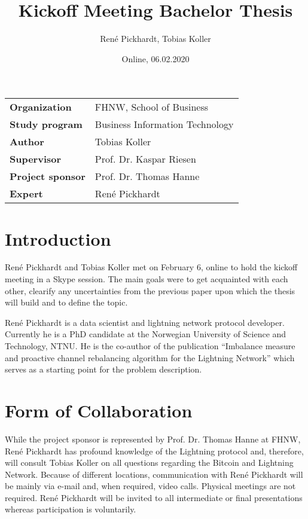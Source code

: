 \documentclass[final]{fhnwreport}       %
\title{Kickoff Meeting Bachelor Thesis}          %
\author{René Pickhardt, Tobias Koller}          %
\date{Online, 06.02.2020}             %
\begin{document}
\maketitle

\vspace*{-1cm}						    %
\vfill

{
\renewcommand\arraystretch{2}
\begin{center}
\begin{tabular}{>{\bf}p{4cm} l}
Organization                  &    FHNW, School of Business\\
Study program                 &    Business Information Technology\\
Author   	                  &    Tobias Koller\\
Supervisor                    &    Prof. Dr. Kaspar Riesen\\
Project sponsor               &    Prof. Dr. Thomas Hanne\\
Expert                        &    René Pickhardt
\end{tabular}
\end{center}
}
\clearpage

\section{Introduction}
René Pickhardt and Tobias Koller met on February 6, online to hold the kickoff meeting in a Skype session. The main goals were to get acquainted with each other, clearify any uncertainties from the previous paper upon which the thesis will build and to define the topic.

René Pickhardt is a data scientist and lightning network protocol developer. Currently he is a PhD candidate at the Norwegian University of Science and Technology, NTNU. He is the co-author of the publication ``Imbalance measure and proactive channel rebalancing algorithm for the Lightning Network'' which serves as a starting point for the problem description.



\section{Form of Collaboration}
While the project sponsor is represented by Prof. Dr. Thomas Hanne at FHNW, René Pickhardt has profound knowledge of the Lightning protocol and, therefore,  will consult Tobias Koller on all questions regarding the Bitcoin and Lightning Network. Because of different locations, communication with René Pickhardt will be mainly via e-mail and, when required, video calls. Physical meetings are not required. René Pickhardt will be invited to all intermediate or final presentations whereas participation is voluntarily.
\end{document}
